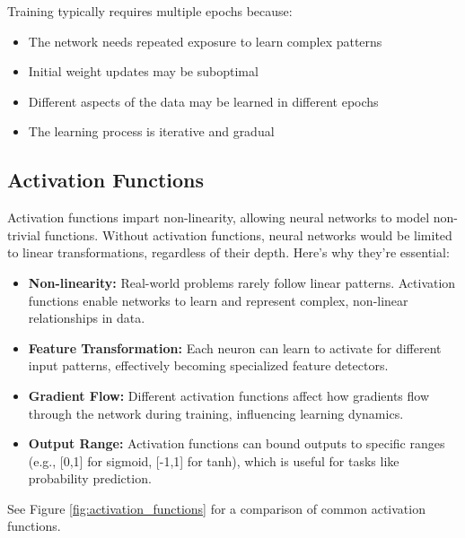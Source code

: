 \noindent
Training typically requires multiple epochs because:
\begin{itemize}
    \item The network needs repeated exposure to learn complex patterns
    \item Initial weight updates may be suboptimal
    \item Different aspects of the data may be learned in different epochs
    \item The learning process is iterative and gradual
\end{itemize}

\subsection{Activation Functions}
\noindent
Activation functions impart non-linearity, allowing neural networks to model non-trivial functions. Without activation functions, neural networks would be limited to linear transformations, regardless of their depth. Here's why they're essential:

\begin{itemize}
    \item \textbf{Non-linearity:} Real-world problems rarely follow linear patterns. Activation functions enable networks to learn and represent complex, non-linear relationships in data.
    
    \item \textbf{Feature Transformation:} Each neuron can learn to activate for different input patterns, effectively becoming specialized feature detectors.
    
    \item \textbf{Gradient Flow:} Different activation functions affect how gradients flow through the network during training, influencing learning dynamics.
    
    \item \textbf{Output Range:} Activation functions can bound outputs to specific ranges (e.g., [0,1] for sigmoid, [-1,1] for tanh), which is useful for tasks like probability prediction.
\end{itemize}

See Figure \ref{fig:activation_functions} for a comparison of common activation functions.

